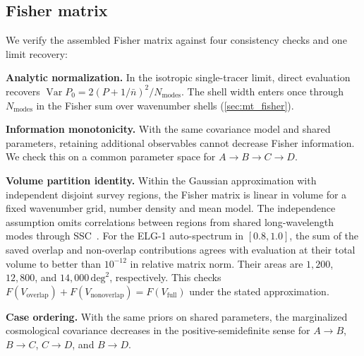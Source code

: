 \documentclass[a4paper,11pt]{article}
\newcommand{\revchange}[1]{{\color{RevisionColor}#1}}
\newcommand{\nbar}{\bar{n}}
\begin{document}
\subsection{Fisher matrix}
\label{app:fisher_checks}

We verify the assembled Fisher matrix against four consistency
checks and one limit recovery:

\begin{enumerate}
\revchange{\item \textbf{Analytic normalization.}
  In the isotropic single-tracer limit, direct evaluation recovers
  $\operatorname{Var}P_0=2(P+1/\nbar)^2/N_{\mathrm{modes}}$.
  The shell width enters once through $N_{\mathrm{modes}}$ in the
  Fisher sum over wavenumber shells (\cref{sec:mt_fisher}).}

\revchange{\item \textbf{Information monotonicity.}
  With the same covariance model and shared parameters, retaining
  additional observables cannot decrease Fisher information. We check
  this on a common parameter space for $A\to B\to C\to D$.}

\item \textbf{Volume partition identity.}
  \revchange{Within the Gaussian approximation with independent disjoint survey
  regions, the Fisher matrix is linear in volume for a
  fixed wavenumber grid, number density and mean model. The independence
  assumption omits correlations between regions from shared
  long-wavelength modes through SSC~\cite{Wadekar:2019rdu,Sugiyama:2019ike}.
  For the
  ELG-1 auto-spectrum in $[0.8,1.0]$, the sum of the saved
  overlap and non-overlap contributions agrees with evaluation at
  their total volume to better than $10^{-12}$ in relative matrix
  norm. Their areas are $1{,}200$, $12{,}800$, and
  $14{,}000\,\mathrm{deg}^2$, respectively. This checks}
  $F(V_{\mathrm{overlap}})+F(V_{\mathrm{nonoverlap}})=F(V_{\mathrm{full}})$
  \revchange{under the stated approximation.}

\revchange{\item \textbf{Case ordering.}
  With the same priors on shared parameters, the marginalized
  cosmological covariance decreases in the positive-semidefinite
  sense for $A\to B$, $B\to C$, $C\to D$, and
  $B\to D$.}


\end{enumerate}
\end{document}
